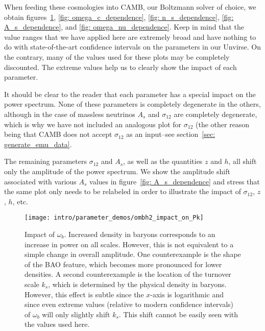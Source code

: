 When feeding these cosmologies into CAMB, our Boltzmann solver of choice, we
obtain figures~\ref{fig: omega_b_dependence}, \ref{fig: omega_c_dependence}, 
\ref{fig: n_s_dependence}, \ref{fig: A_s_dependence}, and \ref{fig: 
omega_nu_dependence}. Keep in mind that the value ranges that we have applied
here are extremely broad and have nothing to do with state-of-the-art
confidence intervals on the parameters in our Unvirse. On the 
contrary, many of the values used for these plots may be completely 
discounted. The extreme values help us to clearly show the impact of each
parameter.

It should be
clear to the reader that each parameter has a special impact on the power
spectrum. None of these parameters is completely degenerate in the others,
although in the case of massless neutrinos $A_s$ and $\sigma_{12}$ are
completely degenerate, which is why we have not included an analogous plot for
$\sigma_{12}$ (the other reason being that CAMB does not accept $\sigma_{12}$
as an input--see section~\ref{sec: generate_emu_data}.

The remaining parameters $\sigma_{12}$ and $A_s$, as well as the quantities 
$z$ and $h$, all shift only the amplitude of the power spectrum. We show the 
amplitude shift associated with various $A_s$ values in figure~\ref{fig: 
A_s_dependence} and stress that the same plot only needs to be relabeled in 
order to illustrate the impact of $\sigma_{12}$, $z$, $h$, etc. 

\begin{figure}[htb]
  \centering
  \texttt{[image: intro/parameter\_demos/ombh2\_impact\_on\_Pk]}
  \caption[Impact of $\omega_b$ on $P(k)$]{Impact of $\omega_b$. Increased
  	density in baryons corresponds to an increase in power on all scales.
  	However, this is not equivalent to a simple change in overall amplitude.
  	One counterexample is the shape of the BAO feature, which becomes more
  	pronounced for lower densities. A second counterexample is the location
  	of the turnover scale $k_s$, which is determined by the physical density
  	in baryons. However, this effect is subtle since the $x$-axis is
  	logarithmic and since even extreme values (relative to modern confidence
  	intervals) of $\omega_b$ will only slightly shift $k_s$. This shift
  	cannot be easily seen with the values used here.} 
  \label{fig: omega_b_dependence}
\end{figure}

